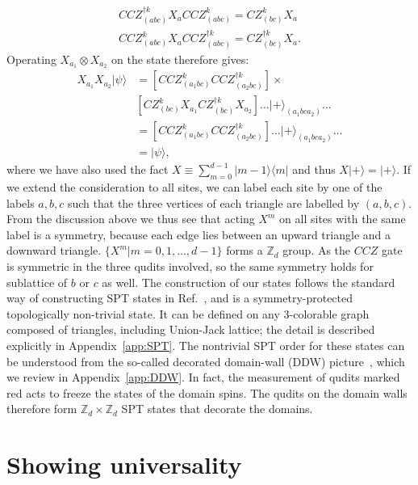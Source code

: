 \documentclass[aps,amsfonts,pra,twocolumn,showpacs]{revtex4-1}
\def\ket#1{\vert#1\rangle}
\newcommand{\zd}{\mathbb{Z}_d}
\begin{document}
	\begin{align}
	CCZ^{\dagger k}_{(abc)} X_a CCZ^k_{(abc)} = CZ_{(bc)}^k X_a \\
	CCZ^k_{(abc)} X_a CCZ^{\dagger k}_{(abc)} = CZ_{(bc)}^{\dagger k} X_a.
	\end{align}
Operating $X_{a_1} \otimes X_{a_2}$ on the state therefore gives:
	\begin{align}
	X_{a_1} X_{a_2} |\psi\rangle & = [CCZ^k_{(a_1bc)} CCZ^{\dagger k}_{(a_2bc)}] \times \nonumber \\
		& [CZ_{(bc)}^k X_{a_1} CZ^{\dagger k}_{(bc)} X_{a_2}] \dots |+\rangle_{(a_1bca_2)} \dots \nonumber \\
		& = [CCZ^k_{(a_1bc)} CCZ^{\dagger k}_{(a_2bc)}] \dots |+\rangle_{(a_1bca_2)} \dots \nonumber \\
		& = |\psi\rangle,
	\end{align}
where we have also used the fact $X\equiv\sum_{m=0}^{d-1} |m-1\rangle \langle m|$ and thus $X \ket+=\ket+$. If we extend the consideration to all sites, we can label each site by one of the labels $a, b, c$ such that  the three vertices of each triangle are labelled by $(a, b, c)$. From the discussion above we thus see that acting $X^m$ on all sites with the same label is a symmetry, because each edge lies between an upward triangle and a downward triangle.  $\{ X^m | m=0, 1, \dots, d-1 \}$ forms a $\zd$ group. As the $CCZ$ gate is symmetric in the three qudits involved, so the same symmetry holds for sublattice of $b$ or $c$ as well. The construction of our states follows the standard way of constructing SPT states in Ref.~\cite{Chen2013, Miller2016_2}, and is a symmetry-protected topologically non-trivial state. It can be defined on any 3-colorable graph composed of triangles, including Union-Jack lattice; the detail is described explicitly in Appendix~\ref{app:SPT}. The nontrivial SPT order for these states can be understood from the so-called decorated domain-wall  (DDW) picture~\cite{Chen2014}, which we review in Appendix~\ref{app:DDW}. In fact, the measurement of qudits marked red acts to freeze the states of the domain spins. The qudits on the domain walls therefore form $\zd \times \zd$ SPT states that decorate the domains.


\section{Showing universality} \label{sec:main}
\end{document}
